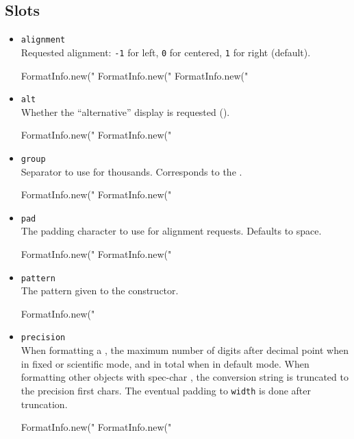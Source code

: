 \subsection{Slots}
\begin{itemize}
\item \lstinline|alignment|\\
  Requested alignment: \lstinline|-1| for left, \lstinline|0| for
  centered, \lstinline|1| for right (default).
\begin{urbiassert}[firstnumber=last]
FormatInfo.new("%
FormatInfo.new("%
FormatInfo.new("%
\end{urbiassert}

\item \lstinline|alt|\\
  Whether the ``alternative'' display is requested (\samp{\#}).
\begin{urbiassert}[firstnumber=last]
FormatInfo.new("%
FormatInfo.new("%
\end{urbiassert}

\item \lstinline|group|\\
  Separator to use for thousands.  Corresponds to the 
  .
\begin{urbiassert}[firstnumber=last]
FormatInfo.new("%
FormatInfo.new("%
\end{urbiassert}

\item \lstinline|pad|\\
  The padding character to use for alignment requests.  Defaults to space.
\begin{urbiassert}[firstnumber=last]
FormatInfo.new("%
FormatInfo.new("%
\end{urbiassert}

\item \lstinline|pattern|\\
  The pattern given to the constructor.
\begin{urbiassert}[firstnumber=last]
FormatInfo.new("%
\end{urbiassert}

\item \lstinline|precision|\\
  When formatting a , the maximum number of digits
  after decimal point when in fixed or scientific mode, and in total
  when in default mode.  When formatting other objects with spec-char
  , the conversion string is truncated to the precision first
  chars. The eventual padding to \lstinline|width| is done after
  truncation.
\begin{urbiassert}[firstnumber=last]
FormatInfo.new("%
FormatInfo.new("%
\end{urbiassert}


\end{itemize}

